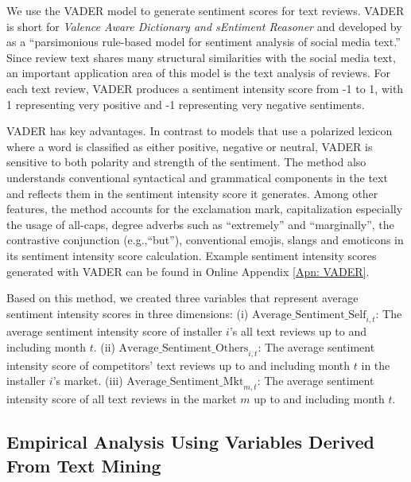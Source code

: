 \documentclass[mnsc,blindrev]{informs3}
\begin{document}
	We use the VADER model to generate sentiment scores for text reviews. VADER is short for \emph{Valence Aware Dictionary and sEntiment Reasoner} and developed by  \cite{hutto2014vader} as a ``parsimonious rule-based model for sentiment analysis of social media text.'' Since review text shares many structural similarities with the social media text, an important application area of this model is the text analysis of reviews. For each text review, VADER produces a sentiment intensity score from -1 to 1, with 1 representing very positive and -1 representing very negative sentiments.
	
	VADER has key advantages. In contrast to models that use a polarized lexicon where a word is classified as either positive, negative or neutral, VADER is sensitive to both polarity and strength of the sentiment.  The method also understands conventional syntactical and grammatical components in the text and reflects them in the sentiment intensity score it generates. Among other features, the method accounts for the exclamation mark, capitalization especially the usage of all-caps, degree adverbs such as ``extremely'' and ``marginally'', the contrastive conjunction (e.g.,``but''), conventional emojis, slangs and emoticons in its sentiment intensity score calculation. Example sentiment intensity scores generated with VADER can be found in Online Appendix \ref{Apn: VADER}.
	

	
	Based on this method, we created three variables that represent average sentiment intensity scores in three dimensions: (i) $\text{Average\_Sentiment\_Self}_{i,t}$: The average sentiment intensity score of installer $i$'s all text reviews up to and including month $t$. (ii) $\text{Average\_Sentiment\_Others}_{i,t}$: The average sentiment intensity score of competitors' text reviews up to and including month $t$ in the installer $i$'s market. (iii) $\text{Average\_Sentiment\_Mkt}_{m,t}$: The average sentiment intensity score of all text reviews in the market $m$ up to and including month $t$.

%



	
\subsection{Empirical Analysis Using Variables Derived From Text Mining}
	
\end{document}
